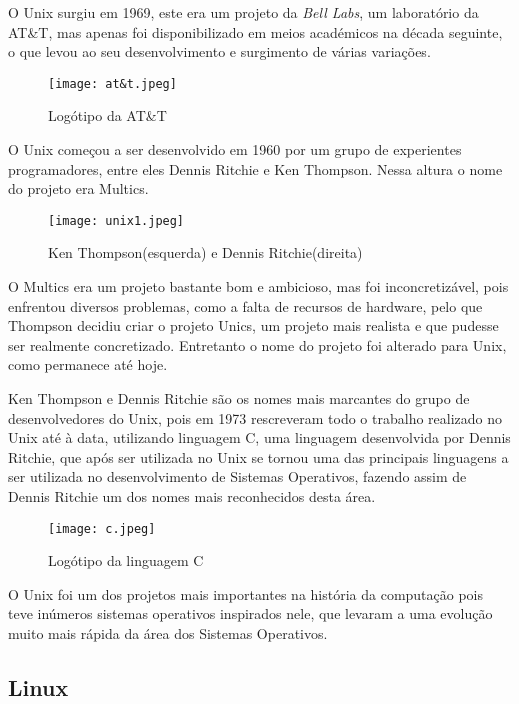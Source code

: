 \documentclass{report}
\begin{document}
O Unix surgiu em 1969, este era um projeto da \textit{Bell Labs}, um laboratório da AT\&T, mas apenas foi disponibilizado em meios académicos na década seguinte, o que levou ao seu desenvolvimento e surgimento de várias variações.

\begin{figure}[h!]
    \centering
    \texttt{[image: at\&t.jpeg]}
    \caption{Logótipo da AT\&T}
\end{figure}
O Unix começou a ser desenvolvido em 1960 por um grupo de experientes programadores, entre eles Dennis Ritchie e Ken Thompson. Nessa altura o nome do projeto era Multics.

\begin{figure}[h!]
    \centering
    \texttt{[image: unix1.jpeg]}
    \caption{Ken Thompson(esquerda) e Dennis Ritchie(direita)}
\end{figure}
O Multics era um projeto bastante bom e ambicioso, mas foi inconcretizável, pois enfrentou diversos problemas, como a falta de recursos de hardware, pelo que Thompson decidiu criar o projeto Unics, um projeto mais realista e que pudesse ser realmente concretizado. Entretanto o nome do projeto foi alterado para Unix, como permanece até hoje. 

\vspace{5mm}

Ken Thompson e Dennis Ritchie são os nomes mais marcantes do grupo de desenvolvedores do Unix, pois em 1973 rescreveram todo o trabalho realizado no Unix até à data, utilizando linguagem C, uma linguagem desenvolvida por Dennis Ritchie, que após ser utilizada no Unix se tornou uma das principais linguagens a ser utilizada no desenvolvimento de Sistemas Operativos, fazendo assim de Dennis Ritchie um dos nomes mais reconhecidos desta área.

\begin{figure}
    \centering
    \texttt{[image: c.jpeg]}
    \caption{Logótipo da linguagem C}
\end{figure}

O Unix foi um dos projetos mais importantes na história da computação pois teve inúmeros sistemas operativos inspirados nele, que levaram a uma evolução muito mais rápida da área dos Sistemas Operativos.

\vspace{5mm}

\subsection{Linux}
\end{document}
